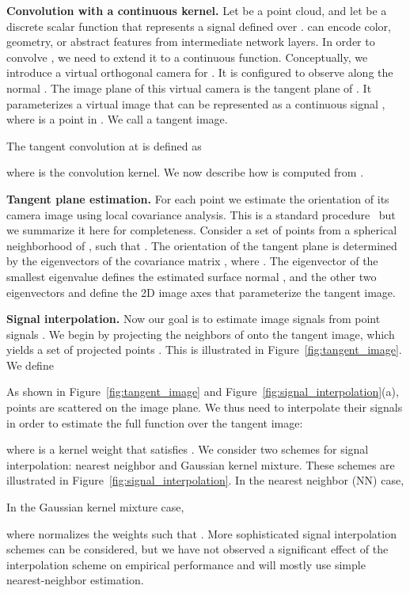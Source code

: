 \documentclass[10pt,twocolumn,letterpaper]{article}
\newcommand\mypara[1]{\vspace{1mm}\noindent\textbf{#1}}
\begin{document}
\mypara{Convolution with a continuous kernel.}
Let  be a point cloud, and let  be a discrete scalar function that represents a signal defined over .
 can encode color, geometry, or abstract features from intermediate network layers.
In order to convolve , we need to extend it to a continuous function.
Conceptually, we introduce a virtual orthogonal camera for .
It is configured to observe  along the normal .
The image plane of this virtual camera is the tangent plane  of .
It parameterizes a virtual image that can be represented as a continuous signal , where  is a point in . We call  a tangent image.

The tangent convolution at  is defined as

where  is the convolution kernel. We now describe how  is computed from .

\mypara{Tangent plane estimation.}
For each point  we estimate the orientation of its camera image using local covariance analysis.
This is a standard procedure~\cite{Salti2014} but we summarize it here for completeness.
Consider a set of points  from a spherical neighborhood of , such that .
The orientation of the tangent plane is determined by the eigenvectors of the covariance matrix , where .
The eigenvector of the smallest eigenvalue defines the estimated surface normal , and the other two eigenvectors  and  define the 2D image axes that parameterize the tangent image.

\mypara{Signal interpolation.}
Now our goal is to estimate image signals  from point signals .
We begin by projecting the neighbors  of  onto the tangent image, which yields a set of projected points .
This is illustrated in Figure~\ref{fig:tangent_image}.
We define

As shown in Figure~\ref{fig:tangent_image} and Figure~\ref{fig:signal_interpolation}(a), points  are scattered on the image plane. We thus need to interpolate their signals in order to estimate the full function  over the tangent image:

where  is a kernel weight that satisfies .
We consider two schemes for signal interpolation: nearest neighbor and Gaussian kernel mixture. These schemes are illustrated in Figure~\ref{fig:signal_interpolation}.
In the nearest neighbor (NN) case,

In the Gaussian kernel mixture case,

where  normalizes the weights such that . More sophisticated signal interpolation schemes can be considered, but we have not observed a significant effect of the interpolation scheme on empirical performance and will mostly use simple nearest-neighbor estimation.
\end{document}
